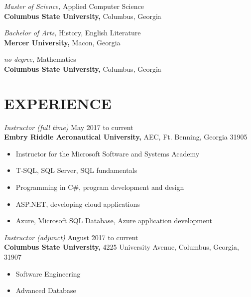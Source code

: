 \documentclass[margin, 10pt]{res} %
\begin{document}
\begin{resume}
{\it Master of Science,} Applied Computer Science\\
\textbf{Columbus State University,} Columbus, Georgia

{\it Bachelor of Arts,} History, English Literature\\
\textbf{Mercer University,} Macon, Georgia

{\it no degree,} Mathematics\\
\textbf{Columbus State University,} Columbus, Georgia

 
\section{EXPERIENCE}
 
%

{\it Instructor (full time)} \hfill May 2017 to current \\
\textbf{Embry Riddle Aeronautical University,} AEC, Ft. Benning, Georgia 31905

\begin{itemize} \itemsep -2pt %
\item Instructor for the Microsoft Software and Systems Academy
\item T-SQL, SQL Server, SQL fundamentals
\item Programming in C\#, program development and design
\item ASP.NET, developing cloud applications
\item Azure, Microsoft SQL Database, Azure application development
\end{itemize}
 
{\it Instructor (adjunct)} \hfill August 2017 to current \\
\textbf{Columbus State University,} 4225 University Avenue, Columbus, Georgia, 31907

\begin{itemize} \itemsep -2pt %
\item Software Engineering
\item Advanced Database
\end{itemize}


\end{resume}
\end{document}
